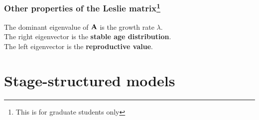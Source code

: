 \documentclass[color=usenames,dvipsnames]{beamer}\usepackage[]{graphicx}\usepackage[]{xcolor}
\begin{document}















\begin{frame}
  \frametitle{Other properties of the Leslie matrix\footnote{This is
      for graduate students only}}
  \large
  The dominant eigenvalue of ${\bf A}$ is the growth rate $\lambda$. \\
  \pause
  \vfill
  The right eigenvector is the {\bf stable age distribution}. \\
  \pause
  \vfill
  The left eigenvector is the {\bf reproductive value}. \\
\end{frame}





\section{Stage-structured models}
\end{document}
